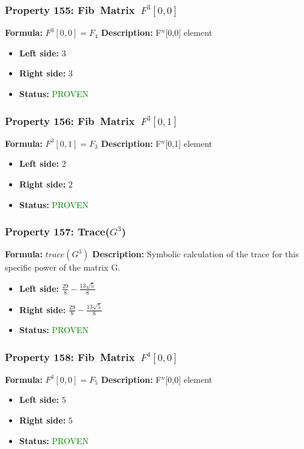 \subsubsection*{Property 155: Fib~Matrix~$F^{3}$$[0,0]$}
\textbf{Formula:} $F^3[0,0] = F_4$
\textbf{Description:} F$^n$[0,0] element

\begin{itemize}
\item \textbf{Left side:} $3$
\item \textbf{Right side:} $3$
\item \textbf{Status:} \textcolor{green}{PROVEN}
\end{itemize}

\subsubsection*{Property 156: Fib~Matrix~$F^{3}$$[0,1]$}
\textbf{Formula:} $F^3[0,1] = F_3$
\textbf{Description:} F$^n$[0,1] element

\begin{itemize}
\item \textbf{Left side:} $2$
\item \textbf{Right side:} $2$
\item \textbf{Status:} \textcolor{green}{PROVEN}
\end{itemize}

\subsubsection*{Property 157: Trace($G^{3}$)}
\textbf{Formula:} $trace(G^3)$
\textbf{Description:} Symbolic calculation of the trace for this specific power of the matrix G.

\begin{itemize}
\item \textbf{Left side:} $\frac{29}{8} - \frac{13 \sqrt{5}}{8}$
\item \textbf{Right side:} $\frac{29}{8} - \frac{13 \sqrt{5}}{8}$
\item \textbf{Status:} \textcolor{green}{PROVEN}
\end{itemize}

\subsubsection*{Property 158: Fib~Matrix~$F^{4}$$[0,0]$}
\textbf{Formula:} $F^4[0,0] = F_5$
\textbf{Description:} F$^n$[0,0] element

\begin{itemize}
\item \textbf{Left side:} $5$
\item \textbf{Right side:} $5$
\item \textbf{Status:} \textcolor{green}{PROVEN}
\end{itemize}

